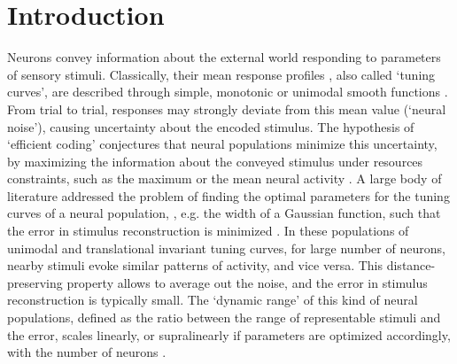 \documentclass[a4paper]{article}
\begin{document}
\section{Introduction}
Neurons convey information about the external world responding to parameters of sensory stimuli. Classically, their  mean response profiles , also called `tuning curves', are described through simple, monotonic or unimodal smooth functions \cite[]{Hubel1959ReceptiveCortex,Georgopoulos1982OnCortex,Dayan2001TheoreticalSystems}. From trial to trial, responses may strongly deviate from this mean value (`neural noise'), causing uncertainty about the encoded stimulus. The hypothesis of `efficient coding' \cite[]{Barlow2013PossibleMessages,Ganguli2014EfficientPopulations} conjectures that neural populations minimize this uncertainty, by maximizing the information about the conveyed stimulus under resources constraints, such as the maximum or the mean neural  activity \cite[]{Harel2020OptimalConstraints}. A large body of literature addressed the problem of finding the optimal parameters for the tuning curves of a neural population, , e.g. the width of a Gaussian function, such that the error in stimulus reconstruction is minimized \cite[]{Zhang1999NeuronalBroaden,Deneve1999ReadingObservers,Pouget1999NarrowCode,Yaeli2010Error-basedNeurons,Fiscella2015VisualNeurons}. In these populations of unimodal and translational invariant tuning curves, for large number of neurons, nearby stimuli evoke similar patterns of activity, and vice versa. This distance-preserving property allows to average out the noise, and the error in stimulus reconstruction is typically small. The `dynamic range' of this kind of neural populations, defined as the ratio between the  range of   representable stimuli and the error, scales linearly, or supralinearly if parameters are optimized accordingly, with the number of neurons
\cite[]{Seung1993SimpleCodes,Berens2011ReassessingFunctions,Kim2020SuperlinearCodes}.
\end{document}
